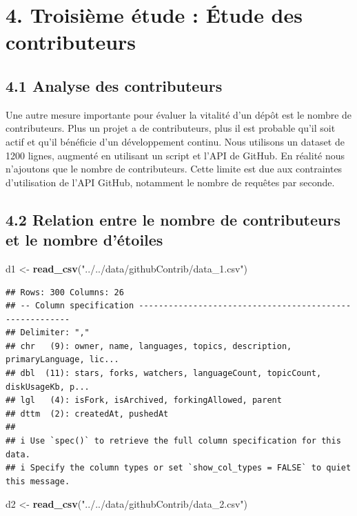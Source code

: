 \documentclass[
]{article}
\newenvironment{Shaded}{\begin{snugshade}}{\end{snugshade}}
\newcommand{\FunctionTok}[1]{\textcolor[rgb]{0.13,0.29,0.53}{\textbf{#1}}}
\newcommand{\NormalTok}[1]{#1}
\newcommand{\OtherTok}[1]{\textcolor[rgb]{0.56,0.35,0.01}{#1}}
\newcommand{\StringTok}[1]{\textcolor[rgb]{0.31,0.60,0.02}{#1}}
\begin{document}
\section{4. Troisième étude : Étude des
contributeurs}\label{troisiuxe8me-uxe9tude-uxe9tude-des-contributeurs}

\subsection{4.1 Analyse des
contributeurs}\label{analyse-des-contributeurs}

Une autre mesure importante pour évaluer la vitalité d'un dépôt est le
nombre de contributeurs. Plus un projet a de contributeurs, plus il est
probable qu'il soit actif et qu'il bénéficie d'un développement continu.
Nous utilisons un dataset de 1200 lignes, augmenté en utilisant un
script et l'API de GitHub. En réalité nous n'ajoutons que le nombre de
contributeurs. Cette limite est due aux contraintes d'utilisation de
l'API GitHub, notamment le nombre de requêtes par seconde.

\subsection{4.2 Relation entre le nombre de contributeurs et le nombre
d'étoiles}\label{relation-entre-le-nombre-de-contributeurs-et-le-nombre-duxe9toiles}

\begin{Shaded}
\begin{Highlighting}[]
\NormalTok{d1 }\OtherTok{\textless{}{-}} \FunctionTok{read\_csv}\NormalTok{(}\StringTok{"../../data/githubContrib/data\_1.csv"}\NormalTok{)}
\end{Highlighting}
\end{Shaded}

\begin{verbatim}
## Rows: 300 Columns: 26
## -- Column specification --------------------------------------------------------
## Delimiter: ","
## chr   (9): owner, name, languages, topics, description, primaryLanguage, lic...
## dbl  (11): stars, forks, watchers, languageCount, topicCount, diskUsageKb, p...
## lgl   (4): isFork, isArchived, forkingAllowed, parent
## dttm  (2): createdAt, pushedAt
## 
## i Use `spec()` to retrieve the full column specification for this data.
## i Specify the column types or set `show_col_types = FALSE` to quiet this message.
\end{verbatim}

\begin{Shaded}
\begin{Highlighting}[]
\NormalTok{d2 }\OtherTok{\textless{}{-}} \FunctionTok{read\_csv}\NormalTok{(}\StringTok{"../../data/githubContrib/data\_2.csv"}\NormalTok{)}
\end{Highlighting}
\end{Shaded}
\end{document}
